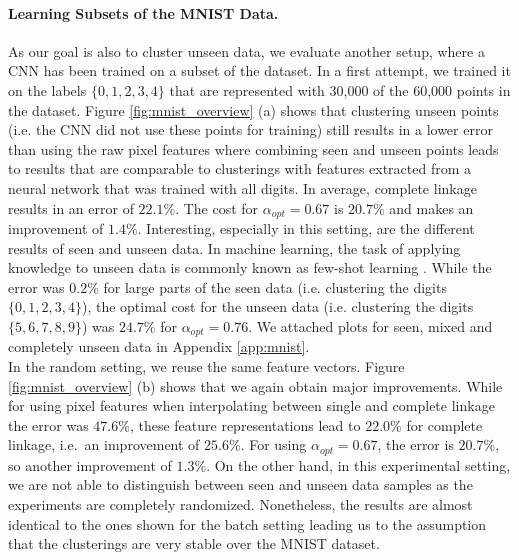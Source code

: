 \paragraph{Learning Subsets of the MNIST Data.} As our goal is also to cluster unseen data, we evaluate another setup, where a CNN has been trained on a subset of the dataset. In a first attempt, we trained it on the labels $\{0,1,2,3,4\}$ that are represented with 30,000 of the 60,000 points in the dataset. Figure \ref{fig:mnist_overview} (a) shows that clustering unseen points (i.e. the CNN did not use these points for training) still results in a lower error than using the raw pixel features where combining seen and unseen points leads to results that are comparable to clusterings with features extracted from a neural network that was trained with all digits. In average, complete linkage results in an error of $22.1\%$. The cost for $\alpha_{opt} = 0.67$ is $20.7\%$ and makes an improvement of $1.4\%$. Interesting, especially in this setting, are the different results of seen and unseen data. In machine learning, the task of applying knowledge to unseen data is commonly known as few-shot learning \cite{ren2018meta}. While the error was $0.2\%$ for large parts of the seen data (i.e. clustering the digits $\{0,1,2,3,4\}$), the optimal cost for the unseen data (i.e. clustering the digits $\{5,6,7,8,9\}$) was $24.7\%$ for $\alpha_{opt} = 0.76$. We attached plots for seen, mixed and completely unseen data in Appendix \ref{app:mnist}.\\

In the random setting, we reuse the same feature vectors. Figure \ref{fig:mnist_overview} (b) shows that we again obtain major improvements. While for using pixel features when interpolating between single and complete linkage the error was $47.6\%$, these feature representations lead to $22.0\%$ for complete linkage, i.e.\ an improvement of $25.6\%$. For using $\alpha_{opt} = 0.67$, the error is $20.7\%$, so another improvement of $1.3\%$. On the other hand, in this experimental setting, we are not able to distinguish between seen and unseen data samples as the experiments are completely randomized. Nonetheless, the results are almost identical to the ones shown for the batch setting leading us to the assumption that the clusterings are very stable over the MNIST dataset.

